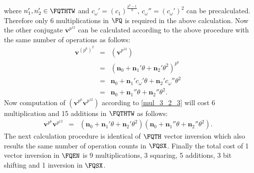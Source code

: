 where $n_1', n_2' \in \FQTHTW$ and $c_{\omega}' = (c_1)^{\frac{p^6-1}{9}}$, $c_{\omega}'' = (c_{\omega}')^2$ can be precalculated. Therefore only 6 multiplications in $\FQ$ is required in the above calculation. 
Now the other conjugate  $\textbf{v}^{p^{12}}$ can be calculated according to the above procedure with the same number of operations as follows: 
\begin{eqnarray}\label{fm_fq_12}
\textbf{v}^{(p^6)^2} & = & (\textbf{v}^{p^{12}}) \nonumber \\
& = &  (\textbf{n}_0 + \textbf{n}_1' \theta + \textbf{n}_2' \theta^2)^{p^{6}} \nonumber \\
& = & \textbf{n}_0 + \textbf{n}_1' c_{\omega}' \theta + \textbf{n}_2' c_{\omega}'' \theta^2 \nonumber \\
& = & \textbf{n}_0 + \textbf{n}_1'' \theta + \textbf{n}_2'' \theta^2 .
\end{eqnarray} 
Now computation of $(\textbf{v}^{p^6}\textbf{v}^{p^{12}})$ according to \eqref{mul_3_2_3} will cost 6 multiplication and 15 additions in $\FQTHTW$ as follows: 
\begin{eqnarray}\label{eq:mul_v6_v12}
\textbf{v}^{p^6}\textbf{v}^{p^{12}} & = & (\textbf{n}_0 + \textbf{n}_1' \theta + \textbf{n}_2' \theta^2)(\textbf{n}_0 + \textbf{n}_1'' \theta + \textbf{n}_2'' \theta^2).
\end{eqnarray}
The next calculation procedure is identical of $\FQTH$ vector inversion which also results the same number of operation counts in $\FQSX$.
Finally the total cost of 1 vector inversion in $\FQEN$ is 9 multiplications, 3 squaring, 5 additions, 3 bit shifting and 1 inversion in $\FQSX$. 


